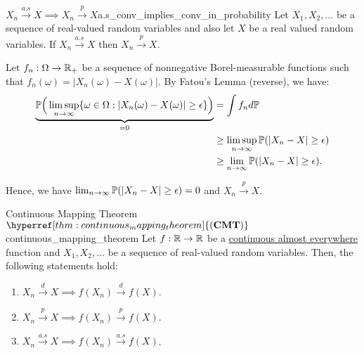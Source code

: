 \begin{proposition}{$X_n\xrightarrow{a.s}X\implies X_n\xrightarrow{p}X$}{a.s_conv_implies_conv_in_probability}
    Let $X_1, X_2,\dots$ be a sequence of real-valued random variables and also let $X$ be a real valued random variables. If $X_n\xrightarrow{a.s}X$ then $X_n\xrightarrow{p}X$.    
\end{proposition}

\begin{proof*}
    Let $f_n:\Omega\to\mathbb{R}_+$ be a sequence of nonnegative Borel-measurable functions such that $f_n(\omega)=|X_n(\omega) - X(\omega)|$. By Fatou's Lemma (reverse), we have:
    \begin{align*}
        \underbrace{\mathbb{P}\Big( \limsup_{n\to\infty} \{\omega\in\Omega:|X_n(\omega) - X(\omega)| \ge \epsilon\} \Big)}_{=0} &= \int f_nd\mathbb{P} \\ 
        &\ge \limsup_{n\to\infty}\mathbb{P}(|X_n - X|\ge\epsilon) \\
        &\ge \lim_{n\to\infty}\mathbb{P}(|X_n - X|\ge\epsilon).
    \end{align*}

    \noindent Hence, we have $\lim_{n\to\infty}\mathbb{P}(|X_n-X|\ge\epsilon)=0$ and $X_n\xrightarrow{p}X$.
\end{proof*}

\newcommand{\CMT}{\hyperref[thm:continuous_mapping_theorem]{(\mathrm{{\bf CMT}})}}
\begin{theorem}{Continuous Mapping Theorem $\CMT$}{continuous_mapping_theorem}
    Let $f:\mathbb{R}\to\mathbb{R}$ be a \underline{continuous almost everywhere} function and $X_1, X_2, \dots$ be a sequence of real-valued random variables. Then, the following statements hold:
    \begin{enumerate}
        \item $X_n\xrightarrow{d}X \implies   f(X_n)\xrightarrow{d}f(X)$.
        \item $X_n\xrightarrow{p}X \implies   f(X_n)\xrightarrow{p}f(X)$.
        \item $X_n\xrightarrow{a.s}X \implies f(X_n)\xrightarrow{a.s}f(X)$.
    \end{enumerate}
\end{theorem}

